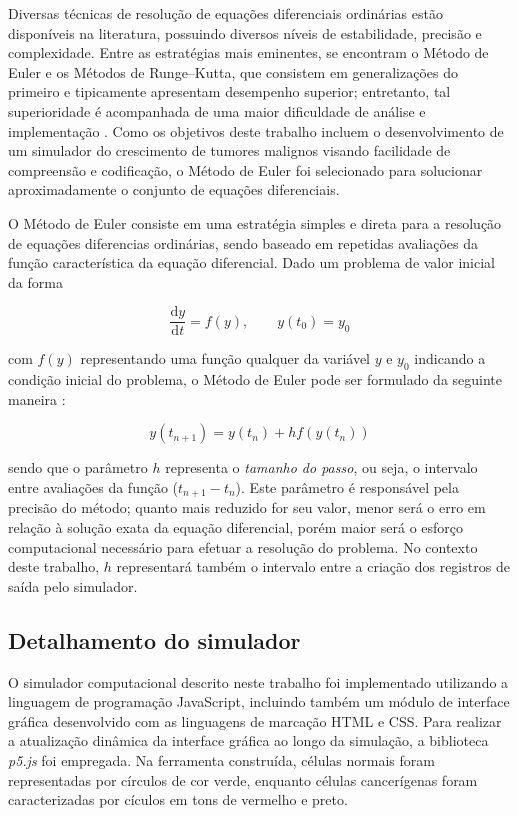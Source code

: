 \documentclass[12pt]{article}
\begin{document}
Diversas técnicas de resolução de equações diferenciais ordinárias estão disponíveis na literatura, possuindo diversos níveis de estabilidade, precisão e complexidade. Entre as estratégias mais eminentes, se encontram o Método de Euler e os Métodos de Runge--Kutta, que consistem em generalizações do primeiro e tipicamente apresentam desempenho superior; entretanto, tal superioridade é acompanhada de uma maior dificuldade de análise e implementação \cite{Butcher2016}. Como os objetivos deste trabalho incluem o desenvolvimento de um simulador do crescimento de tumores malignos visando facilidade de compreensão e codificação, o Método de Euler foi selecionado para solucionar aproximadamente o conjunto de equações diferenciais.

O Método de Euler consiste em uma estratégia simples e direta para a resolução de equações diferencias ordinárias, sendo baseado em repetidas avaliações da função característica da equação diferencial. Dado um problema de valor inicial da forma

\begin{equation}
  \frac{\mathrm{d} y}{\mathrm{d} t} = f(y), \qquad y(t_{0}) = y_{0}
\end{equation}

\noindent com $f(y)$ representando uma função qualquer da variável $y$ e $y_{0}$ indicando a condição inicial do problema, o Método de Euler pode ser formulado da seguinte maneira \cite{Butcher2016}:

\begin{equation}
  y(t_{n+1}) = y(t_{n}) + h f(y(t_{n}))
\end{equation}

\noindent sendo que o parâmetro $h$ representa o \emph{tamanho do passo}, ou seja, o intervalo entre avaliações da função ($t_{n+1} - t_{n}$). Este parâmetro é responsável pela precisão do método; quanto mais reduzido for seu valor, menor será o erro em relação à solução exata da equação diferencial, porém maior será o esforço computacional necessário para efetuar a resolução do problema. No contexto deste trabalho, $h$ representará também o intervalo entre a criação dos registros de saída pelo simulador.

\subsection{Detalhamento do simulador} \label{sec:simulator}

O simulador computacional descrito neste trabalho foi implementado utilizando a linguagem de programação JavaScript, incluindo também um módulo de interface gráfica desenvolvido com as linguagens de marcação HTML e CSS. Para realizar a atualização dinâmica da interface gráfica ao longo da simulação, a biblioteca \emph{p5.js} foi empregada. Na ferramenta construída, células normais foram representadas por círculos de cor verde, enquanto células cancerígenas foram caracterizadas por cículos em tons de vermelho e preto.
\end{document}
